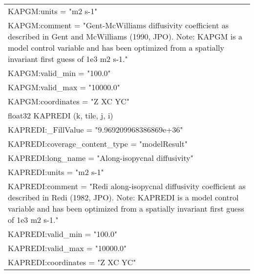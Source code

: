 \begin{longtable}{|p{\textwidth}|}
\hspace{0.5cm}\hspace{0.5cm}KAPGM:units = "m2 s-1"\\
\hspace{0.5cm}\hspace{0.5cm}KAPGM:comment = "Gent-McWilliams diffusivity coefficient as described in Gent and McWilliams (1990, JPO). Note: KAPGM is a model control variable and has been optimized from a spatially invariant first guess of 1e3 m2 s-1."\\
\hspace{0.5cm}\hspace{0.5cm}KAPGM:valid\_min = "100.0"\\
\hspace{0.5cm}\hspace{0.5cm}KAPGM:valid\_max = "10000.0"\\
\hspace{0.5cm}\hspace{0.5cm}KAPGM:coordinates = "Z XC YC"\\
\hspace{0.5cm}float32 KAPREDI (k, tile, j, i)\\
\hspace{0.5cm}\hspace{0.5cm}KAPREDI:\_FillValue = "9.969209968386869e+36"\\
\hspace{0.5cm}\hspace{0.5cm}KAPREDI:coverage\_content\_type = "modelResult"\\
\hspace{0.5cm}\hspace{0.5cm}KAPREDI:long\_name = "Along-isopycnal diffusivity"\\
\hspace{0.5cm}\hspace{0.5cm}KAPREDI:units = "m2 s-1"\\
\hspace{0.5cm}\hspace{0.5cm}KAPREDI:comment = "Redi along-isopycnal diffusivity coefficient as described in Redi (1982, JPO). Note: KAPREDI is a model control variable and has been optimized from a spatially invariant first guess of 1e3 m2 s-1."\\
\hspace{0.5cm}\hspace{0.5cm}KAPREDI:valid\_min = "100.0"\\
\hspace{0.5cm}\hspace{0.5cm}KAPREDI:valid\_max = "10000.0"\\
\hspace{0.5cm}\hspace{0.5cm}KAPREDI:coordinates = "Z XC YC"\\
\hline
\end{longtable}